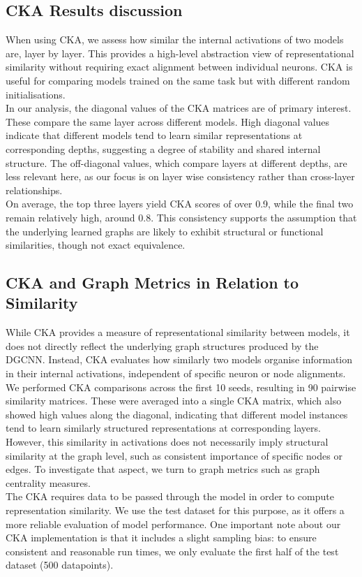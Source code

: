 \subsection{CKA Results discussion}
When using CKA, we assess how similar the internal activations of two models are, layer by layer. This provides a high-level abstraction view of representational similarity without requiring exact alignment between individual neurons. CKA is useful for comparing models trained on the same task but with different random initialisations.
\vspace{0.5em}\\
In our analysis, the diagonal values of the CKA matrices are of primary interest. These compare the same layer across different models. High diagonal values indicate that different models tend to learn similar representations at corresponding depths, suggesting a degree of stability and shared internal structure. The off-diagonal values, which compare layers at different depths, are less relevant here, as our focus is on layer wise consistency rather than cross-layer relationships.
\vspace{0.5em}\\
On average, the top three layers yield CKA scores of over 0.9, while the final two remain relatively high, around 0.8. This consistency supports the assumption that the underlying learned graphs are likely to exhibit structural or functional similarities, though not exact equivalence.
\subsection{CKA and Graph Metrics in Relation to Similarity}
While CKA provides a measure of representational similarity between models, it does not directly reflect the underlying graph structures produced by the DGCNN. Instead, CKA evaluates how similarly two models organise information in their internal activations, independent of specific neuron or node alignments. We performed CKA comparisons across the first 10 seeds, resulting in 90 pairwise similarity matrices. These were averaged into a single CKA matrix, which also showed high values along the diagonal, indicating that different model instances tend to learn similarly structured representations at corresponding layers. However, this similarity in activations does not necessarily imply structural similarity at the graph level, such as consistent importance of specific nodes or edges. To investigate that aspect, we turn to graph metrics such as graph centrality measures. \\
The CKA requires data to be passed through the model in order to compute representation similarity. We use the test dataset for this purpose, as it offers a more reliable evaluation of model performance. One important note about our CKA implementation is that it includes a slight sampling bias: to ensure consistent and reasonable run times, we only evaluate the first half of the test dataset (500 datapoints).
